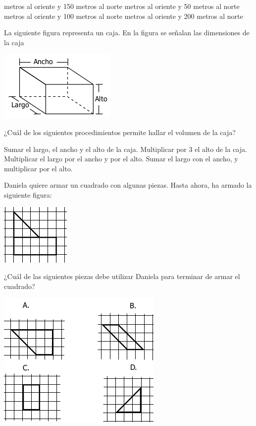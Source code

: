 \documentclass[10pt,letterpaper,addpoints]{exam}
\begin{document}
\begin{multicols}{2}
\begin{questions}
\begin{choices}
 metros al oriente y 150 metros al norte
 metros al oriente y 50 metros al norte
 metros al oriente y 100 metros al norte
 metros al oriente y 200 metros al norte
\end{choices}
\question La siguiente figura representa un caja. En la figura se señalan las dimensiones de la caja
\begin{center}
\includegraphics[scale=.5]{Images/caja.png} 
\end{center}
¿Cuál de los siguientes procedimientos permite hallar el volumen de la caja?
\begin{choices}
\choice Sumar el largo, el ancho y el alto de la caja.
\choice Multiplicar por 3 el alto de la caja.
\CorrectChoice Multiplicar el largo por el ancho y por el alto.
\choice Sumar el largo con el ancho, y multiplicar por el alto.
\end{choices}
\question Daniela quiere armar un cuadrado con algunas piezas. Hasta ahora, ha armado la siguiente figura:
\begin{center}
\includegraphics[scale=.5]{Images/figura06_03.png} 
\end{center}
¿Cuál de las siguientes piezas debe utilizar Daniela para terminar de armar el cuadrado?
\begin{center}
\includegraphics[scale=.65]{Images/figuras_06_03.png} 
\end{center}
\end{questions}
\end{multicols}
\end{document}
